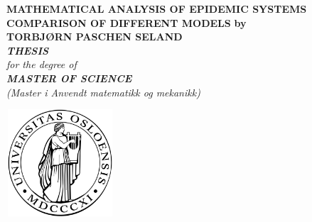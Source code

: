%
\thispagestyle{empty}
\begin{center}        %
  \vspace{5mm}          %
  \LARGE
  \textbf{MATHEMATICAL ANALYSIS OF EPIDEMIC SYSTEMS \\ COMPARISON OF DIFFERENT MODELS}
  \Large
  \vspace{5mm}
  \textbf{by} \\
  \vspace{5mm}
  \large
  \textbf{TORBJØRN PASCHEN SELAND} \\
  \vspace{30mm}
  \Large
  {\bf{\textsl{THESIS}}} \\
  \textsl{for the degree of} \\
  \vspace{2mm}
  {\bf{\textsl{MASTER OF SCIENCE}}} \\
  \vspace{5mm}
  {\large \textsl {(Master i Anvendt matematikk og mekanikk)}}\\
  \vspace{10mm}
  \centerline{\includegraphics[width=4cm,height=4cm]{uiologo.png}}

\end{center}
